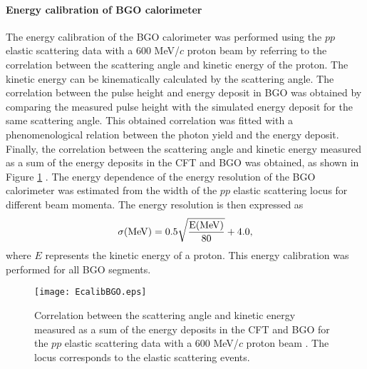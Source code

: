 \vspace{10pt}
\paragraph{Energy calibration of BGO calorimeter}
\label{sec-EcalibBGO}
The energy calibration of the BGO calorimeter was performed using the $pp$ elastic scattering data with a 600 MeV/$c$ proton beam by referring to the correlation between the scattering angle and kinetic energy of the proton. The kinetic energy can be kinematically calculated by the scattering angle. The correlation between the pulse height and energy deposit in BGO was obtained by comparing the measured pulse height with the simulated energy deposit for the same scattering angle. This obtained correlation was fitted with a phenomenological relation between the photon yield and the energy deposit. %
Finally, the correlation between the scattering angle and kinetic energy measured as a sum of the energy deposits in the CFT and BGO was obtained, as shown in Figure \ref{fig-EcalibBGO} \cite{Miwa-SMp}. The energy dependence of the energy resolution of the BGO calorimeter was estimated from the width of the $pp$ elastic scattering locus for different beam momenta. The energy resolution is then expressed as
\begin{equation}
  \sigma (\rm{MeV}) = 0.5 \sqrt{\frac{E(\rm{MeV})}{80}} + 4.0,
\end{equation}
where $E$ represents the kinetic energy of a proton. This energy calibration was performed for all BGO segments.

\begin{figure}[!h]
  \begin{center}
    \texttt{[image: EcalibBGO.eps]}
    \caption{Correlation between the scattering angle and kinetic energy measured as a sum of the energy deposits in the CFT and BGO for the $pp$ elastic scattering data with a 600 MeV/$c$ proton beam \cite{Miwa-SMp}. The locus corresponds to the elastic scattering events.}
    \label{fig-EcalibBGO}
  \end{center}
\end{figure}


\vspace{10pt}

